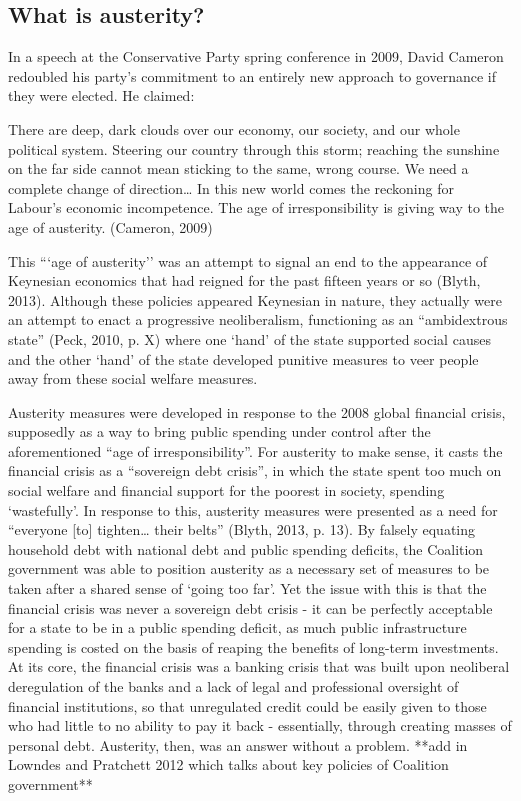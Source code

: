 \subsection{What is austerity?}
\label{what-is-austerity}

In a speech at the Conservative Party spring conference in 2009, David
Cameron redoubled his party's commitment to an entirely new approach to
governance if they were elected. He claimed:

There are deep, dark clouds over our economy, our society, and our whole
political system. Steering our country through this storm; reaching the
sunshine on the far side cannot mean sticking to the same, wrong course.
We need a complete change of direction\ldots{} In this new world comes
the reckoning for Labour's economic incompetence. The age of
irresponsibility is giving way to the age of austerity. (Cameron, 2009)

This ```age of austerity'' was an attempt to signal an end to the
appearance of Keynesian economics that had reigned for the past fifteen
years or so (Blyth, 2013). Although these policies appeared Keynesian in
nature, they actually were an attempt to enact a progressive
neoliberalism, functioning as an ``ambidextrous state'' (Peck, 2010, p.
X) where one `hand' of the state supported social causes and the other
`hand' of the state developed punitive measures to veer people away from
these social welfare measures.

Austerity measures were developed in response to the 2008 global
financial crisis, supposedly as a way to bring public spending under
control after the aforementioned ``age of irresponsibility''. For
austerity to make sense, it casts the financial crisis as a ``sovereign
debt crisis'', in which the state spent too much on social welfare and
financial support for the poorest in society, spending `wastefully'. In
response to this, austerity measures were presented as a need for
``everyone {[}to{]} tighten\ldots{} their belts'' (Blyth, 2013, p. 13).
By falsely equating household debt with national debt and public
spending deficits, the Coalition government was able to position
austerity as a necessary set of measures to be taken after a shared
sense of `going too far'. Yet the issue with this is that the financial
crisis was never a sovereign debt crisis - it can be perfectly
acceptable for a state to be in a public spending deficit, as much
public infrastructure spending is costed on the basis of reaping the
benefits of long-term investments. At its core, the financial crisis was
a banking crisis that was built upon neoliberal deregulation of the
banks and a lack of legal and professional oversight of financial
institutions, so that unregulated credit could be easily given to those
who had little to no ability to pay it back - essentially, through
creating masses of personal debt. Austerity, then, was an answer without
a problem. **add in Lowndes and Pratchett 2012 which talks about key
policies of Coalition government**

